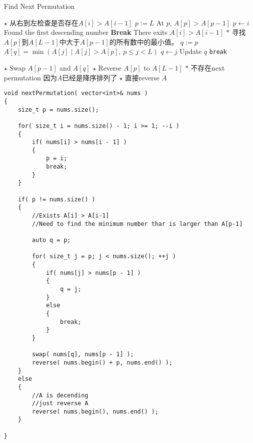 \begin{figure}[H]
\end{figure}

\setcounter{algorithm}{0}
\begin{algorithm}[H]
\caption{Find Next Permutation}
\begin{algorithmic}[1]
\State $\star$ 从右到左检查是否存在$A[i]>A[i-1]$
\State $p:=L$ \Comment At $p$, $A[p] > A[p-1]$
\State $p\gets i$ \Comment Found the first descending number
\State \textbf{Break}
\EndIf
\EndFor
{} \Comment There exits $A[i] > A[i-1]$
\State $\ast$ 寻找$A[p]$到$A[L-1]$中大于$A[p-1]$的所有数中的最小值。
\State $q:=p$ \Comment $A[q] =\min(A[j]\;|\;A[j] > A[p],\ p\leq j<L)$
\State $q\gets j$ \Comment Update $q$ 
\Else
\State \texttt{break}
\EndIf
\EndFor
{}
\end{algorithmic}
\end{algorithm}
\begin{algorithm}[H]
\begin{algorithmic}[1]
\State $\star$ Swap $A[p-1]$ and $A[q]$
\State $\star$ Reverse $A[p]$ to $A[L-1]$
\Else
\State $\ast$ 不存在next permutation 因为$A$已经是降序排列了
\State $\star$ 直接reverse $A$
\EndIf
\EndProcedure
\end{algorithmic}
\end{algorithm}
\setcounter{lstlisting}{0}
\begin{lstlisting}[style=customc, caption={Next Permutation}]
void nextPermutation( vector<int>& nums )
{
    size_t p = nums.size();

    for( size_t i = nums.size() - 1; i >= 1; --i )
    {
        if( nums[i] > nums[i - 1] )
        {
            p = i;
            break;
        }
    }

    if( p != nums.size() )
    {
        //Exists A[i] > A[i-1]
        //Need to find the minimum number thar is larger than A[p-1]

        auto q = p;

        for( size_t j = p; j < nums.size(); ++j )
        {
            if( nums[j] > nums[p - 1] )
            {
                q = j;
            }
            else
            {
                break;
            }
        }

        swap( nums[q], nums[p - 1] );
        reverse( nums.begin() + p, nums.end() );
    }
    else
    {
        //A is decending
        //just reverse A
        reverse( nums.begin(), nums.end() );
    }

}
\end{lstlisting}